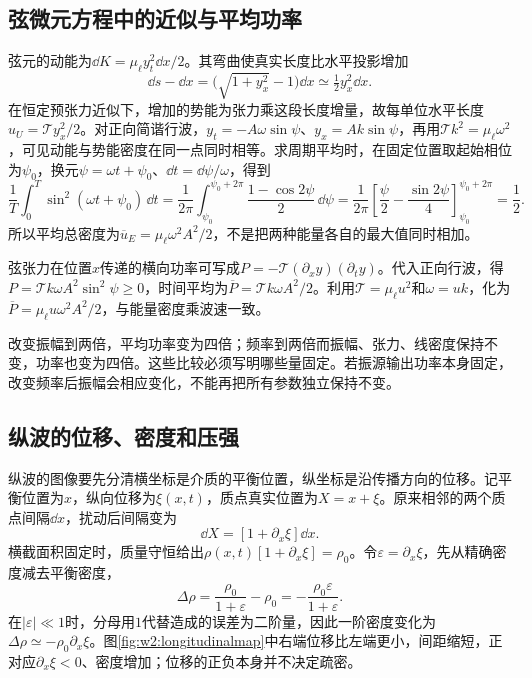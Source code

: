 \subsection{弦微元方程中的近似与平均功率}
弦元的动能为$\dd K=\mu_\ell y_t^2\dd x/2$。其弯曲使真实长度比水平投影增加
\[
\dd s-\dd x=\bigl(\sqrt{1+y_x^2}-1\bigr)\dd x
\simeq\tfrac12y_x^2\dd x.
\]
在恒定预张力近似下，增加的势能为张力乘这段长度增量，故每单位水平长度$u_U=\mathcal T y_x^2/2$。对正向简谐行波，$y_t=-A\omega\sin\psi$、$y_x=Ak\sin\psi$，再用$\mathcal T k^2=\mu_\ell\omega^2$，可见动能与势能密度在同一点同时相等。求周期平均时，在固定位置取起始相位为$\psi_0$，换元$\psi=\omega t+\psi_0$、$\dd t=\dd\psi/\omega$，得到
\[
\frac1T\int_0^T\sin^2(\omega t+\psi_0)\,\dd t
=\frac1{2\pi}\int_{\psi_0}^{\psi_0+2\pi}\frac{1-\cos2\psi}{2}\,\dd\psi
=\frac1{2\pi}\left[\frac\psi2-\frac{\sin2\psi}{4}\right]_{\psi_0}^{\psi_0+2\pi}
=\frac12.
\]
所以平均总密度为$\overline u_E=\mu_\ell\omega^2A^2/2$，不是把两种能量各自的最大值同时相加。

弦张力在位置$x$传递的横向功率可写成$P=-\mathcal T(\partial_xy)(\partial_ty)$。代入正向行波，得$P=\mathcal T k\omega A^2\sin^2\psi\ge0$，时间平均为$\overline P=\mathcal T k\omega A^2/2$。利用$\mathcal T=\mu_\ell u^2$和$\omega=uk$，化为$\overline P=\mu_\ell u\omega^2A^2/2$，与能量密度乘波速一致。

改变振幅到两倍，平均功率变为四倍；频率到两倍而振幅、张力、线密度保持不变，功率也变为四倍。这些比较必须写明哪些量固定。若振源输出功率本身固定，改变频率后振幅会相应变化，不能再把所有参数独立保持不变。



\subsection{纵波的位移、密度和压强}
纵波的图像要先分清横坐标是介质的平衡位置，纵坐标是沿传播方向的位移。记平衡位置为$x$，纵向位移为$\xi(x,t)$，质点真实位置为$X=x+\xi$。原来相邻的两个质点间隔$\dd x$，扰动后间隔变为
\[
\dd X=[1+\partial_x\xi]\dd x.
\]
横截面积固定时，质量守恒给出$\rho(x,t)[1+\partial_x\xi]=\rho_0$。令$\varepsilon=\partial_x\xi$，先从精确密度减去平衡密度，
\[
\Delta\rho=\frac{\rho_0}{1+\varepsilon}-\rho_0
=-\frac{\rho_0\varepsilon}{1+\varepsilon}.
\]
在$|\varepsilon|\ll1$时，分母用$1$代替造成的误差为二阶量，因此一阶密度变化为$\Delta\rho\simeq-\rho_0\partial_x\xi$。图\ref{fig:w2:longitudinalmap}中右端位移比左端更小，间距缩短，正对应$\partial_x\xi<0$、密度增加；位移的正负本身并不决定疏密。

